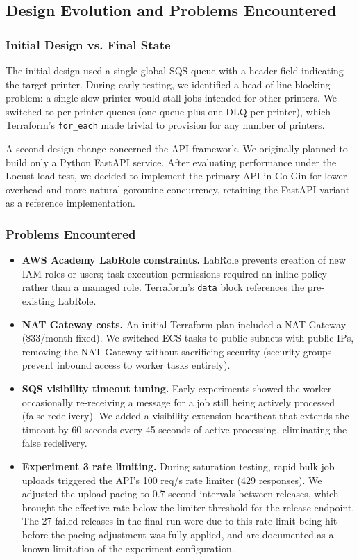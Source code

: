 \documentclass[11pt,letterpaper]{article}
\newcommand{\code}[1]{\texttt{\small #1}}
\begin{document}
\subsection{Design Evolution and Problems Encountered}

\subsubsection{Initial Design vs. Final State}
The initial design used a single global SQS queue with a header field indicating the target printer. During early testing, we identified a head-of-line blocking problem: a single slow printer would stall jobs intended for other printers. We switched to per-printer queues (one queue plus one DLQ per printer), which Terraform's \code{for\_each} made trivial to provision for any number of printers.

A second design change concerned the API framework. We originally planned to build only a Python FastAPI service. After evaluating performance under the Locust load test, we decided to implement the primary API in Go Gin for lower overhead and more natural goroutine concurrency, retaining the FastAPI variant as a reference implementation.

\subsubsection{Problems Encountered}
\begin{itemize}[noitemsep]
  \item \textbf{AWS Academy LabRole constraints.} LabRole prevents creation of new IAM roles or users; task execution permissions required an inline policy rather than a managed role. Terraform's \code{data} block references the pre-existing LabRole.
  \item \textbf{NAT Gateway costs.} An initial Terraform plan included a NAT Gateway (\$33/month fixed). We switched ECS tasks to public subnets with public IPs, removing the NAT Gateway without sacrificing security (security groups prevent inbound access to worker tasks entirely).
  \item \textbf{SQS visibility timeout tuning.} Early experiments showed the worker occasionally re-receiving a message for a job still being actively processed (false redelivery). We added a visibility-extension heartbeat that extends the timeout by 60 seconds every 45 seconds of active processing, eliminating the false redelivery.
  \item \textbf{Experiment 3 rate limiting.} During saturation testing, rapid bulk job uploads triggered the API's 100 req/s rate limiter (429 responses). We adjusted the upload pacing to 0.7 second intervals between releases, which brought the effective rate below the limiter threshold for the release endpoint. The 27 failed releases in the final run were due to this rate limit being hit before the pacing adjustment was fully applied, and are documented as a known limitation of the experiment configuration.
\end{itemize}
\end{document}
